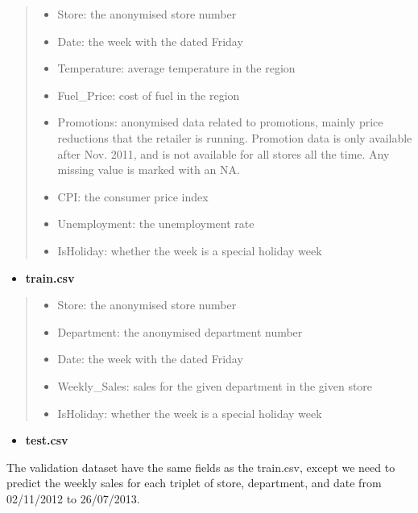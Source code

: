 \documentclass[11pt,]{article}
\providecommand{\tightlist}{%
  \setlength{\itemsep}{0pt}\setlength{\parskip}{0pt}}
\begin{document}
\begin{quote}
\begin{itemize}
\tightlist
\item
  Store: the anonymised store number
\item
  Date: the week with the dated Friday
\item
  Temperature: average temperature in the region
\item
  Fuel\_Price: cost of fuel in the region
\item
  Promotions: anonymised data related to promotions, mainly price
  reductions that the retailer is running. Promotion data is only
  available after Nov. 2011, and is not available for all stores all the
  time. Any missing value is marked with an NA.
\item
  CPI: the consumer price index
\item
  Unemployment: the unemployment rate
\item
  IsHoliday: whether the week is a special holiday week
\end{itemize}
\end{quote}

\begin{itemize}
\tightlist
\item
  \textbf{train.csv}
\end{itemize}

\begin{quote}
\begin{itemize}
\tightlist
\item
  Store: the anonymised store number
\item
  Department: the anonymised department number
\item
  Date: the week with the dated Friday
\item
  Weekly\_Sales: sales for the given department in the given store
\item
  IsHoliday: whether the week is a special holiday week
\end{itemize}
\end{quote}

\begin{itemize}
\tightlist
\item
  \textbf{test.csv}
\end{itemize}

The validation dataset have the same fields as the train.csv, except we
need to predict the weekly sales for each triplet of store, department,
and date from 02/11/2012 to 26/07/2013.
\end{document}
